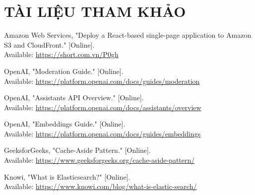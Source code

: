 \clearpage
\section{TÀI LIỆU THAM KHẢO}
\begin{thebibliography}{00}

Amazon Web Services, "Deploy a React-based single-page application to Amazon S3 and CloudFront." [Online].\\
Available: \url{https://short.com.vn/P0gh}

OpenAI, "Moderation Guide." [Online].\\
Available: \url{https://platform.openai.com/docs/guides/moderation}

OpenAI, "Assistants API Overview." [Online].\\
Available: \url{https://platform.openai.com/docs/assistants/overview}

OpenAI, "Embeddings Guide." [Online].\\
Available: \url{https://platform.openai.com/docs/guides/embeddings}

GeeksforGeeks, "Cache-Aside Pattern." [Online].\\
Available: \url{https://www.geeksforgeeks.org/cache-aside-pattern/}

Knowi, "What is Elasticsearch?" [Online].\\
Available: \url{https://www.knowi.com/blog/what-is-elastic-search/}

\end{thebibliography}
